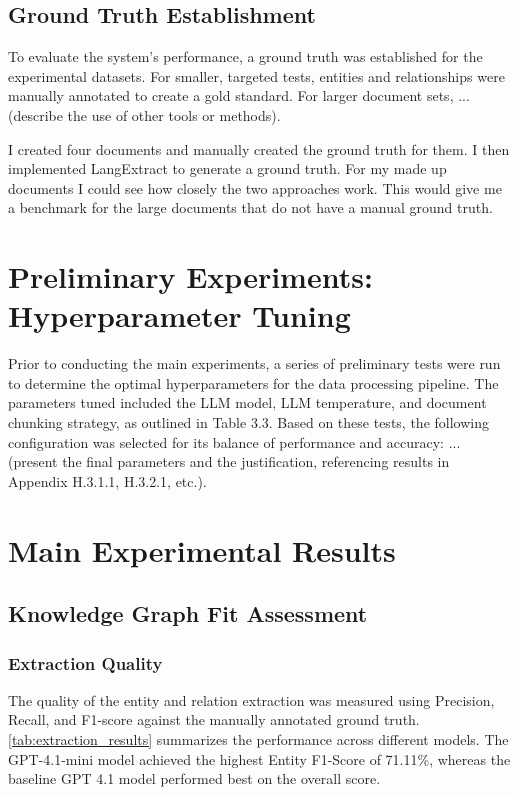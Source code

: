 \subsection{Ground Truth Establishment}
To evaluate the system's performance, a ground truth was established for the experimental datasets. For smaller, targeted tests, entities and relationships were manually annotated to create a gold standard. For larger document sets, ... (describe the use of other tools or methods).

I created four documents and manually created the ground truth for them. I then implemented LangExtract to generate a ground truth. For my made up documents I could see how closely the two approaches work. This would give me a benchmark for the large documents that do not have a manual ground truth.

\section{Preliminary Experiments: Hyperparameter Tuning}
\label{sec:hyperparameter_tuning}
Prior to conducting the main experiments, a series of preliminary tests were run to determine the optimal hyperparameters for the data processing pipeline. The parameters tuned included the LLM model, LLM temperature, and document chunking strategy, as outlined in Table 3.3. Based on these tests, the following configuration was selected for its balance of performance and accuracy: ... (present the final parameters and the justification, referencing results in Appendix H.3.1.1, H.3.2.1, etc.).

\section{Main Experimental Results}
\label{sec:main_results}

\subsection{Knowledge Graph Fit Assessment}
\label{subsec:kg_fit}
\subsubsection{Extraction Quality}
The quality of the entity and relation extraction was measured using Precision, Recall, and F1-score against the manually annotated ground truth. \cref{tab:extraction_results} summarizes the performance across different models. The GPT-4.1-mini model achieved the highest Entity F1-Score of 71.11\%, whereas the baseline GPT 4.1 model performed best on the overall score.

